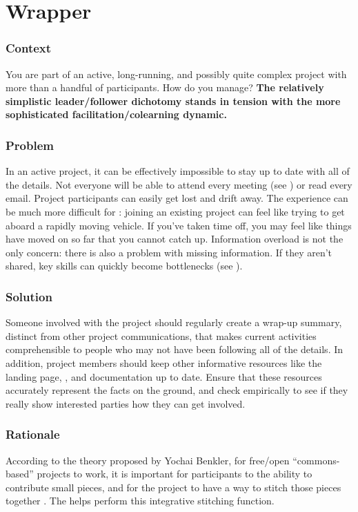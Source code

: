 
\section{Wrapper}\label{sec:Wrapper}

\subsubsection*{Context} You are part of an active, long-running, and possibly quite complex project with more than a handful of participants.  How do you manage?
\textbf{The relatively simplistic leader/follower dichotomy stands in tension with the more sophisticated facilitation/colearning dynamic.}

\subsubsection*{Problem} In an active project, it can be effectively impossible to stay up to date with all of the details.  Not everyone will be able to attend every meeting (see ) or read every email.  Project participants can easily get lost and drift away.  The experience can be much more difficult for : joining an existing project can feel like trying to get aboard a rapidly moving vehicle.  If you've taken time off, you may feel like things have moved on so far that you cannot catch up.  Information overload is not the only concern: there is also a problem with missing information.  If they aren't shared, key skills can quickly become bottlenecks (see ).

\subsubsection*{Solution}
Someone involved with the project should regularly create a wrap-up summary, distinct from other project communications, that makes current activities comprehensible to people who may not have been following all of the details.  In addition, project members should keep other informative resources like the landing page, , and documentation up to date.  Ensure that these resources accurately represent the facts on the ground, and check empirically to see if they really show interested parties how they can get involved.

\subsubsection*{Rationale}
According to the theory proposed by Yochai Benkler, for free/open ``commons-based'' projects to work, it is important for participants to the ability to contribute small pieces, and for the project to have a way to stitch those pieces together \cite{coases-penguin}.  The  helps perform this integrative stitching function.

